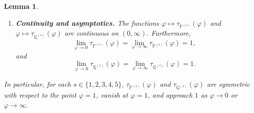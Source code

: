\documentclass[10pt,a4paper]{amsart}
\newtheorem{lem}{Lemma}
\begin{document}
\begin{lem}
\begin{enumerate}
  \item[(iii)] \textbf{Continuity and asymptotics.} The functions
  $\varphi\mapsto\tau_{\mathbb{P}^{(s)}}(\varphi)$ and 
  $\varphi\mapsto\tau_{\mathbb{Q}^{(s)}}(\varphi)$ are continuous on $(0,\infty)$.
  Furthermore,
  \begin{equation}\label{eq:tau-asymptotics}
  \lim_{\varphi\to 0} \tau_{\mathbb{P}^{(s)}}(\varphi)
  =
  \lim_{\varphi\to\infty} \tau_{\mathbb{P}^{(s)}}(\varphi)
  = 1,
  \end{equation}
  and
  \begin{equation}\label{eq:tauQ-asymptotics}
  \lim_{\varphi\to 0} \tau_{\mathbb{Q}^{(s)}}(\varphi)
  =
  \lim_{\varphi\to\infty} \tau_{\mathbb{Q}^{(s)}}(\varphi)
  = 1.
  \end{equation}
\end{enumerate}
In particular, for each $s\in\{1,2,3,4,5\}$,
$\tau_{\mathbb{P}^{(s)}}(\varphi)$ and $\tau_{\mathbb{Q}^{(s)}}(\varphi)$ are
symmetric with respect to the point $\varphi=1$, vanish at $\varphi=1$, and
approach $1$ as $\varphi\to 0$ or $\varphi\to\infty$.
\end{lem}
\end{document}
